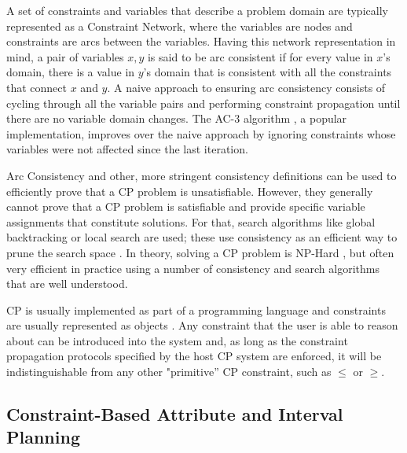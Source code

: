 A set of constraints and variables that describe a problem domain are
typically represented as a Constraint Network, where the variables are
nodes and constraints are arcs between the variables. Having this
network representation in mind, a pair of variables $x,y$ is said to be arc consistent if for every
value in $x$'s domain, there is a value in $y$'s domain that is
consistent with all the constraints that connect $x$ and $y$.  A naive
approach to ensuring arc consistency consists of cycling through all
the variable pairs and performing constraint propagation until there
are no variable domain changes. The AC-3 algorithm \cite{mackworth77},
a popular implementation, improves over the naive approach by ignoring
constraints whose variables were not affected since the last
iteration. 

Arc Consistency and other, more stringent consistency definitions can be
used to efficiently prove that a CP problem is unsatisfiable. However,
they generally cannot prove that a CP problem is satisfiable and
provide specific variable assignments that constitute solutions. For
that, search algorithms like global backtracking  or local search are used; these use consistency as an
efficient way to prune the search space . In theory, solving a CP problem is NP-Hard
\cite{ghallab04}, but often very efficient in practice using a number
of consistency and search algorithms that are well understood.

CP is usually implemented as part of a programming language and
constraints are usually represented as objects \cite{puget95}. Any
constraint that the user is able to reason about can be introduced into the system and, as long as the constraint
propagation protocols specified by the host CP system are enforced, it
will be indistinguishable from any other "primitive'' CP constraint,
such as $\leq$ or $\geq$.

\subsection{Constraint-Based Attribute and Interval Planning}
\label{sec:europa:cp}

